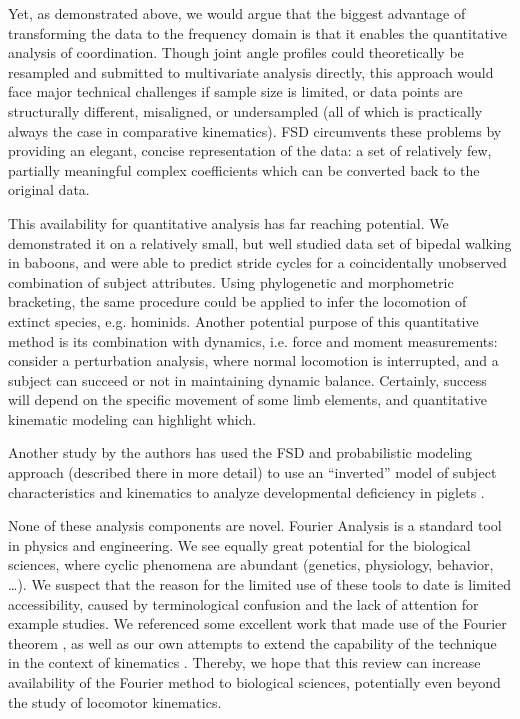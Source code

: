 Yet, as demonstrated above, we would argue that the biggest advantage of transforming the data to the frequency domain is that it enables the quantitative analysis of coordination.
Though joint angle profiles could theoretically be resampled and submitted to multivariate analysis directly, this approach would face major technical challenges if sample size is limited, or data points are structurally different, misaligned, or undersampled (all of which is practically always the case in comparative kinematics).
FSD circumvents these problems by providing an elegant, concise representation of the data: a set of relatively few, partially meaningful complex coefficients which can be converted back to the original data.


This availability for quantitative analysis has far reaching potential.
We demonstrated it on a relatively small, but well studied data set of bipedal walking in baboons, and were able to predict stride cycles for a coincidentally unobserved combination of subject attributes.
Using phylogenetic and morphometric bracketing, the same procedure could be applied to infer the locomotion of extinct species, e.g. hominids.
Another potential purpose of this quantitative method is its combination with dynamics, i.e. force and moment measurements:
consider a perturbation analysis, where normal locomotion is interrupted, and a subject can succeed or not in maintaining dynamic balance.
Certainly, success will depend on the specific movement of some limb elements, and quantitative kinematic modeling can highlight which.

Another study by the authors has used the FSD and probabilistic modeling approach (described there in more detail) to use an ``inverted'' model of subject characteristics and kinematics to analyze developmental deficiency in piglets \citep{Mielke2022}.


None of these analysis components are novel.
Fourier Analysis is a standard tool in physics and engineering.
We see equally great potential for the biological sciences, where cyclic phenomena are abundant (genetics, physiology, behavior, \ldots{}).
We suspect that the reason for the limited use of these tools to date is limited accessibility, caused by terminological confusion and the lack of attention for example studies.
We referenced some excellent work that made use of the Fourier theorem \citep{Bernstein1935,Pike2002,Webb2007}, as well as our own attempts to extend the capability of the technique in the context of kinematics \citep{Mielke2019,Mielke2022}.
Thereby, we hope that this review can increase availability of the Fourier method to biological sciences, potentially even beyond the study of locomotor kinematics.




